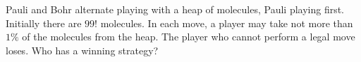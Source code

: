 \problem
Pauli and Bohr alternate playing with a heap of molecules, Pauli playing first.
Initially there are $99!$ molecules.
In each move, a player may take not more than $1\%$ of the molecules from the
heap.
The player who cannot perform a legal move loses. Who has a winning strategy?
\solution
\endproblem
